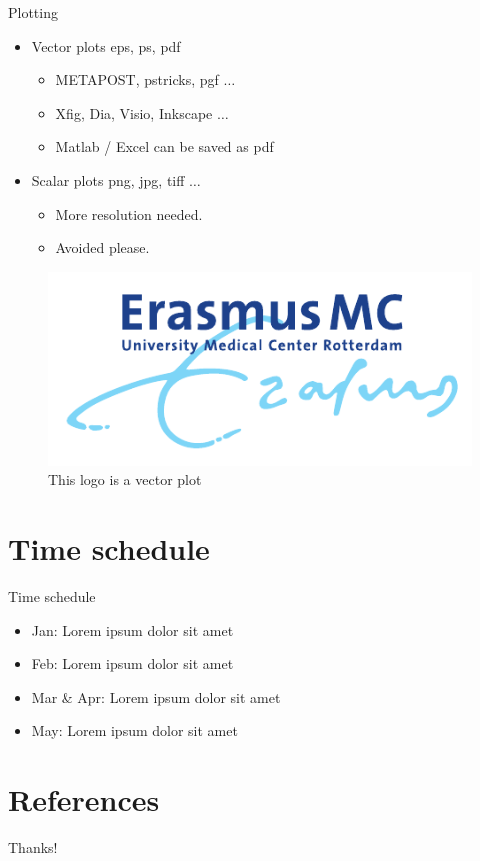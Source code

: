 \documentclass{beamer}
\begin{document}
\begin{frame}{Plotting}
    \begin{itemize}
        \item Vector plots eps, ps, pdf
        \begin{itemize}
            \item METAPOST, pstricks, pgf $\ldots$
            \item Xfig, Dia, Visio, Inkscape $\ldots$
            \item Matlab / Excel can be saved as pdf
        \end{itemize}
        \item Scalar plots png, jpg, tiff $\ldots$
        \begin{itemize}
            \item More resolution needed.
            \item Avoided please.
        \end{itemize}
    \end{itemize}
    \begin{figure}[htpb]
        \centering
        \includegraphics[width=0.2\linewidth]{pic/erasmusmc_logo.pdf}
        \caption{This logo is a vector plot}
    \end{figure}
\end{frame}

\section{Time schedule}
\begin{frame}{Time schedule}
    \begin{itemize}
        \item Jan: Lorem ipsum dolor sit amet
        \item Feb: Lorem ipsum dolor sit amet
        \item Mar \& Apr: Lorem ipsum dolor sit amet
        \item May: Lorem ipsum dolor sit amet
    \end{itemize}
\end{frame}

\section{References}

\begin{frame}[allowframebreaks]
    \printbibliography[heading=none]
\end{frame}

\begin{frame}
    \begin{center}
        {\Huge\calligra Thanks!}
    \end{center}
\end{frame}
\end{document}
